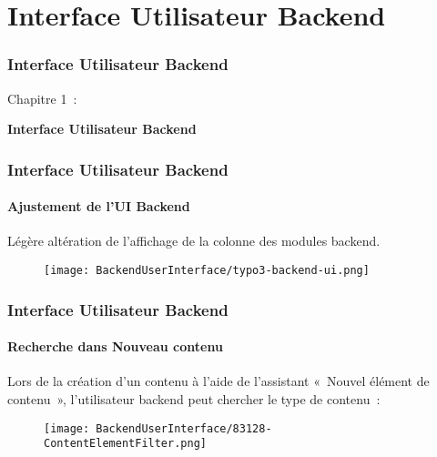%

\section{Interface Utilisateur Backend}
\begin{frame}[fragile]
	\frametitle{Interface Utilisateur Backend}

	\begin{center}\huge{Chapitre 1~:}\end{center}
	\begin{center}\huge{\color{typo3darkgrey}\textbf{Interface Utilisateur Backend}}\end{center}

\end{frame}


\begin{frame}[fragile]
	\frametitle{Interface Utilisateur Backend}
	\framesubtitle{Ajustement de l'UI Backend}

	Légère altération de l'affichage de la colonne des modules backend.

	\begin{figure}
		\texttt{[image: BackendUserInterface/typo3-backend-ui.png]}
	\end{figure}

\end{frame}


\begin{frame}[fragile]
	\frametitle{Interface Utilisateur Backend}
	\framesubtitle{Recherche dans Nouveau contenu}

	Lors de la création d'un contenu à l'aide de l'assistant «~Nouvel élément de contenu~»,
	l'utilisateur backend peut chercher le type de contenu~:

	\begin{figure}
		\texttt{[image: BackendUserInterface/83128-ContentElementFilter.png]}
	\end{figure}

\end{frame}

